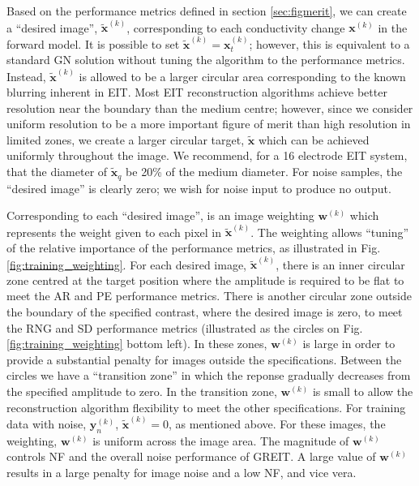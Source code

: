 \documentclass[12pt]{iopart}
\newcommand{\xB}{\mbox{$\mathbf{x}$}}
\newcommand{\xT}{\mbox{$\mathbf{\tilde x}$}}
\newcommand{\yB}{\mbox{$\mathbf{y}$}}
\newcommand{\wB}{\mbox{$\mathbf{w}$}}
\begin{document}
Based on the performance metrics defined
in section \ref{sec:figmerit},
we can create a ``desired image'',
$\xT^{(k)}$, corresponding to each conductivity change
$\xB^{(k)}$ in the forward model. It is possible to set
$\xT^{(k)} = \xB_t^{(k)}$; however, this is equivalent to a standard
GN solution without tuning the algorithm to the 
performance metrics. Instead, $\xT^{(k)}$ is allowed to be
a larger circular area corresponding to the known
blurring inherent in EIT. Most EIT reconstruction algorithms
achieve better resolution near the boundary than the medium
centre; however, since we consider uniform resolution to
be a more important figure of merit than high resolution
in limited zones, we create a larger circular target, $\xT$
which can be achieved uniformly throughout the image.
We recommend, for a 16 electrode
EIT system, that the diameter of $\xT_q$
be 20\% of the medium diameter.
For noise samples, the ``desired image'' is clearly
zero; we wish for noise input to produce no output.

Corresponding to each ``desired image'', is an image
weighting $\wB^{(k)}$ which represents the weight given to 
each pixel in $\xT^{(k)}$. The weighting allows ``tuning''
of the relative importance of the  performance metrics,
as illustrated in Fig. \ref{fig:training_weighting}.
For each desired image, $\xT^{(k)}$, there is an inner
circular zone centred at the target position
where the amplitude is required to be
flat to meet the AR and PE performance metrics.
There is another circular zone outside the boundary
of the specified contrast, where the desired image
is zero, to meet the RNG and SD performance metrics
(illustrated as the circles on Fig. 
\ref{fig:training_weighting} bottom left).
In these zones, $\wB^{(k)}$ is large in order to
provide a substantial penalty for images outside the
specifications. Between the circles we have a 
``transition zone'' in which the reponse gradually
decreases from the specified amplitude to zero.
In the transition zone, $\wB^{(k)}$ is small to allow 
the reconstruction algorithm flexibility to meet the
other specifications. For training data with noise,
$\yB_n^{(k)}$, $\xT^{(k)}=0$, as mentioned above.
For these images, the weighting, $\wB^{(k)}$ is
uniform across the image area. The magnitude
of $\wB^{(k)}$ controls NF and the overall noise
performance of GREIT. A large value of $\wB^{(k)}$ 
results in a large penalty for image noise 
and a low NF, and vice vera.
\end{document}
